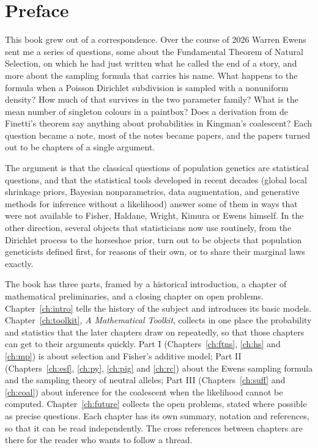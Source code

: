 \chapter*{Preface}

This book grew out of a correspondence. Over the course of 2026 Warren Ewens sent me a series of
questions, some about the Fundamental Theorem of Natural Selection, on which he had just written
what he called the end of a story, and more about the sampling formula that carries his name. What
happens to the formula when a Poisson Dirichlet subdivision is sampled with a nonuniform density?
How much of that survives in the two parameter family? What is the mean number of singleton colours
in a paintbox? Does a derivation from de Finetti's theorem say anything about probabilities in
Kingman's coalescent? Each question became a note, most of the notes became papers, and the papers
turned out to be chapters of a single argument.

The argument is that the classical questions of population genetics are statistical questions, and
that the statistical tools developed in recent decades (global local shrinkage priors,
Bayesian nonparametrics, data augmentation, and generative methods for inference without a
likelihood) answer some of them in ways that were not available to Fisher, Haldane, Wright, Kimura
or Ewens himself. In the other direction, several objects that statisticians now use routinely,
from the Dirichlet process to the horseshoe prior, turn out to be objects that population
geneticists defined first, for reasons of their own, or to share their marginal laws exactly.

The book has three parts, framed by a historical introduction, a chapter of mathematical
preliminaries, and a closing chapter on open problems. Chapter~\ref{ch:intro} tells the history of
the subject and introduces its basic models. Chapter~\ref{ch:toolkit}, \emph{A Mathematical
Toolkit}, collects in one place the probability and statistics that the later chapters draw on
repeatedly, so that those chapters can get to their arguments quickly. Part I
(Chapters~\ref{ch:ftns}, \ref{ch:hs} and \ref{ch:mp}) is about selection and Fisher's additive
model; Part II (Chapters~\ref{ch:esf}, \ref{ch:py}, \ref{ch:pig} and \ref{ch:rc}) about the Ewens
sampling formula and the sampling theory of neutral alleles; Part III (Chapters~\ref{ch:suff} and
\ref{ch:coal}) about inference for the coalescent when the likelihood cannot be computed.
Chapter~\ref{ch:future} collects the open problems, stated where possible as precise questions.
Each chapter has its own summary, notation and
references, so that it can be read independently. The cross references between chapters are there
for the reader who wants to follow a thread.

